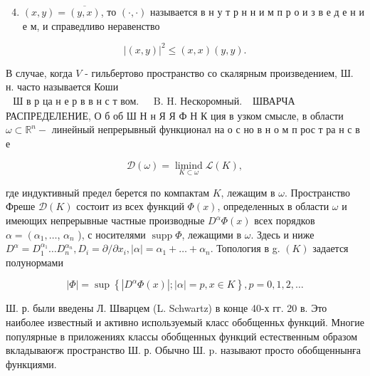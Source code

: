 \documentclass[10pt]{article}
\begin{document}
\begin{enumerate}

  \setcounter{enumi}{3}

  \item $(x, y)=\overline{(y, x)}$, то $(\cdot, \cdot)$ называется в н у т р н н и м п р о и з в е д е н и е м, и справедливо неравенство

\end{enumerate}



\[

|(x, y)|^{2} \leqslant(x, x)(y, y) .

\]



В случае, когда $V$ - гильбертово пространство со скалярным произведением, Ш. н. часто называется Коши $\begin{array}{ll}\text { Ш в р ца н е р в в н с т вом. } & \text { B. H. Нескоромный. }\end{array}$ ШВАРЧА РАСПРЕДЕЛЕНИЕ, О б об Ш Н н Я Я Ф Н К ция в узком смысле, в области $\omega \subset \mathbb{R}^{n}-$ линейный непрерывный функционал на о с но в н о м п рос т ра н с в е



\[

\mathscr{D}(\omega)=\underset{K \subset \omega}{\operatorname{limind}} \mathscr{L}(K),

\]



где индуктивный предел берется по компактам $K$, лежащим в $\omega$. Пространство Фреше $\mathscr{D}(K)$ состоит из всех функций $\Phi(x)$, определенных в области $\omega$ и имеющих непрерывные частные производные $D^{\alpha} \Phi(x)$ всех порядков $\alpha=\left(\alpha_{1}, \ldots\right.$, $\alpha_{n}$ ), с носителями $\operatorname{supp} \Phi$, лежащими в $\omega$. Здесь и ниже $D^{\alpha}=D_{1}^{\alpha_{1}} \ldots D_{n}^{\alpha_{n}}, D_{i}=\partial / \partial x_{i},|\alpha|=\alpha_{1}+\ldots+\alpha_{n}$. Топология в g. $(K)$ задается полунормами



\[

|\Phi|=\sup \left\{\left|D^{\alpha} \Phi(x)\right| ;|\alpha|=p, x \in K\right\}, p=0,1,2, \ldots

\]



Ш. р. были введены Л. Шварцем (L. Schwartz) в конце 40-х гг. 20 в. Это наиболее известный и активно используемый класс обобщенньх функций. Многие популярные в приложениях классы обобщенных функций естественным образом вкладываюғж пространство Ш. р. Обычно Ш. p. называют просто обобщеннынға функциями.
\end{document}

